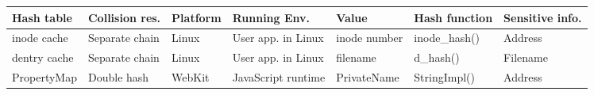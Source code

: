 \begin{tabular}{lllllll}
  \toprule
  {\bf Hash table} & {\bf Collision res.} & {\bf Platform} & {\bf Running Env.}  & {\bf Value}  & {\bf Hash function} & {\bf Sensitive info.} \\
  \midrule                                                                  
  inode cache      & Separate chain       & Linux          & User app. in Linux  & inode number & inode_hash()        & Address               \\
  dentry cache     & Separate chain       & Linux          & User app. in Linux  & filename     & d_hash()            & Filename              \\
  PropertyMap      & Double hash          & WebKit         & JavaScript runtime  & PrivateName  & StringImpl()        & Address               \\
  \bottomrule
  \end{tabular}

